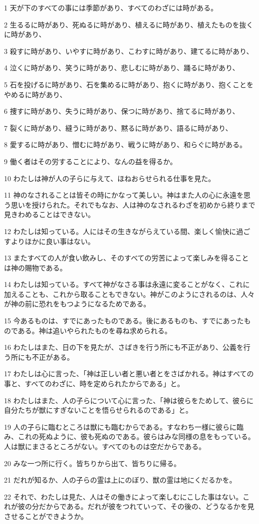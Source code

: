 \par 1 天が下のすべての事には季節があり、すべてのわざには時がある。
\par 2 生るるに時があり、死ぬるに時があり、植えるに時があり、植えたものを抜くに時があり、
\par 3 殺すに時があり、いやすに時があり、こわすに時があり、建てるに時があり、
\par 4 泣くに時があり、笑うに時があり、悲しむに時があり、踊るに時があり、
\par 5 石を投げるに時があり、石を集めるに時があり、抱くに時があり、抱くことをやめるに時があり、
\par 6 捜すに時があり、失うに時があり、保つに時があり、捨てるに時があり、
\par 7 裂くに時があり、縫うに時があり、黙るに時があり、語るに時があり、
\par 8 愛するに時があり、憎むに時があり、戦うに時があり、和らぐに時がある。
\par 9 働く者はその労することにより、なんの益を得るか。
\par 10 わたしは神が人の子らに与えて、ほねおらせられる仕事を見た。
\par 11 神のなされることは皆その時にかなって美しい。神はまた人の心に永遠を思う思いを授けられた。それでもなお、人は神のなされるわざを初めから終りまで見きわめることはできない。
\par 12 わたしは知っている。人にはその生きながらえている間、楽しく愉快に過ごすよりほかに良い事はない。
\par 13 またすべての人が食い飲みし、そのすべての労苦によって楽しみを得ることは神の賜物である。
\par 14 わたしは知っている。すべて神がなさる事は永遠に変ることがなく、これに加えることも、これから取ることもできない。神がこのようにされるのは、人々が神の前に恐れをもつようになるためである。
\par 15 今あるものは、すでにあったものである。後にあるものも、すでにあったものである。神は追いやられたものを尋ね求められる。
\par 16 わたしはまた、日の下を見たが、さばきを行う所にも不正があり、公義を行う所にも不正がある。
\par 17 わたしは心に言った、「神は正しい者と悪い者とをさばかれる。神はすべての事と、すべてのわざに、時を定められたからである」と。
\par 18 わたしはまた、人の子らについて心に言った、「神は彼らをためして、彼らに自分たちが獣にすぎないことを悟らせられるのである」と。
\par 19 人の子らに臨むところは獣にも臨むからである。すなわち一様に彼らに臨み、これの死ぬように、彼も死ぬのである。彼らはみな同様の息をもっている。人は獣にまさるところがない。すべてのものは空だからである。
\par 20 みな一つ所に行く。皆ちりから出て、皆ちりに帰る。
\par 21 だれが知るか、人の子らの霊は上にのぼり、獣の霊は地にくだるかを。
\par 22 それで、わたしは見た、人はその働きによって楽しむにこした事はない。これが彼の分だからである。だれが彼をつれていって、その後の、どうなるかを見させることができようか。

